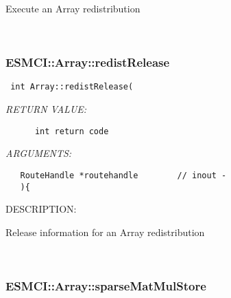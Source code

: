       Execute an Array redistribution
   
 
\mbox{}\hrulefill\
 
\subsubsection [ESMCI::Array::redistRelease] {ESMCI::Array::redistRelease}


  
\begin{verbatim} int Array::redistRelease(\end{verbatim}{\em RETURN VALUE:}
\begin{verbatim}      int return code\end{verbatim}{\em ARGUMENTS:}
\begin{verbatim}   RouteHandle *routehandle        // inout -
   ){\end{verbatim}
{\sf DESCRIPTION:\\ }


      Release information for an Array redistribution
   
 
\mbox{}\hrulefill\
 
\subsubsection [ESMCI::Array::sparseMatMulStore] {ESMCI::Array::sparseMatMulStore}


